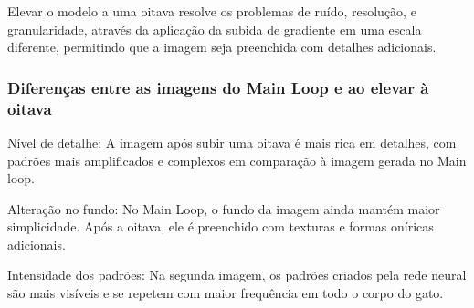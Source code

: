 Elevar o modelo a uma oitava resolve os problemas de ruído, resolução, e granularidade, através da aplicação da subida de gradiente em uma escala diferente, permitindo que a imagem seja preenchida com detalhes adicionais.
\subsubsection*{Diferenças entre as imagens do Main Loop e ao elevar à oitava}
Nível de detalhe: A imagem após subir uma oitava é mais rica em detalhes, com padrões mais amplificados e complexos em comparação à imagem gerada no Main loop.

Alteração no fundo: No Main Loop, o fundo da imagem ainda mantém maior simplicidade. Após a oitava, ele é preenchido com texturas e formas oníricas adicionais.

Intensidade dos padrões: Na segunda imagem, os padrões criados pela rede neural são mais visíveis e se repetem com maior frequência em todo o corpo do gato.